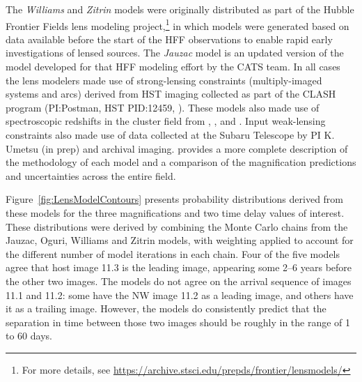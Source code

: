 The {\it Williams} and {\it Zitrin} models were originally distributed
as part of the Hubble Frontier Fields lens modeling
project,\footnote{For more details, see
  \url{https://archive.stsci.edu/prepds/frontier/lensmodels/}} in
which models were generated based on data available before the start
of the HFF observations to enable rapid early investigations of lensed
sources. The {\it Jauzac} model is an updated version of the model
developed for that HFF modeling effort by the CATS team.  In all cases
the lens modelers made use of strong-lensing constraints
(multiply-imaged systems and arcs) derived from HST imaging collected
as part of the CLASH program (PI:Postman, HST PID:12459,
\citealt{Postman:2012}). These models also made use of spectroscopic
redshifts in the cluster field from \citet{Mann:2012},
\citet{Christensen:2012}, and \citet{Grillo:2015a}.  Input
weak-lensing constraints also made use of data collected at the Subaru
Telescope by PI K. Umetsu (in prep) and archival imaging.
\citet{Priewe:2016} provides a more complete description of the
methodology of each model and a comparison of the magnification
predictions and uncertainties across the entire  field.

Figure~\ref{fig:LensModelContours} presents probability distributions
derived from these models for the three magnifications and two time
delay values of interest.  These distributions were derived by
combining the Monte Carlo chains from the Jauzac, Oguri, Williams and
Zitrin models, with weighting applied to account for the different
number of model iterations in each chain. Four of the five models
agree that host image 11.3 is the leading image, appearing some 2--6
years before the other two images.  The models do not agree on the
arrival sequence of images 11.1 and 11.2: some have the NW image 11.2
as a leading image, and others have it as a trailing image.  However,
the models do consistently predict that the separation in time between
those two images should be roughly in the range of 1 to 60 days.
